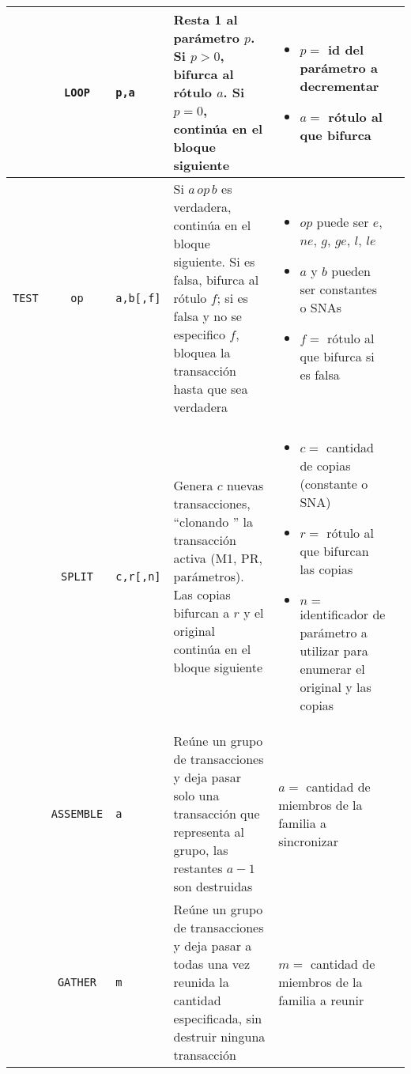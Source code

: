 \documentclass{article}
\providecommand{\tabularnewline}{\\}
\begin{document}
\begin{longtable}{|lc>{\raggedright}p{}|>{\raggedright}p{}|>{\raggedright}p{}|>{\raggedright}p{}|}
\hline
& \texttt{LOOP} & \texttt{p,a} &
Resta 1 al parámetro $p$. Si $p>0$, bifurca al rótulo $a$. Si $p=0$, continúa en el bloque siguiente &
\begin{itemize}
  \item $p=$ id del parámetro a decrementar
  \item $a=$ rótulo al que bifurca
\end{itemize} & \tabularnewline

\hline
\texttt{TEST} & \texttt{op} & \texttt{a,b[,f]} &
Si $a \, op \, b$ es verdadera, continúa en el bloque siguiente.
Si es falsa, bifurca al rótulo $f$; si es falsa y no se especifico $f$,
bloquea la transacción hasta que sea verdadera &
\begin{itemize}
  \item $op$ puede ser $e$, $ne$, $g$, $ge$, $l$, $le$
  \item $a$ y $b$ pueden ser constantes o SNAs
  \item $f=$ rótulo al que bifurca si es falsa
\end{itemize} & \tabularnewline

\hline
\pagebreak

\hline
\multicolumn{6}{c}{\textbf{Familias de transacciones}} \tabularnewline

\hline
& \texttt{SPLIT} & \texttt{c,r[,n]} &
Genera $c$ nuevas transacciones, \textquotedblleft clonando \textquotedblright{}
la transacción activa (M1, PR, parámetros). Las copias bifurcan a $r$ y
el original continúa en el bloque siguiente &
\begin{itemize}
  \item $c=$ cantidad de copias (constante o SNA)
  \item $r=$ rótulo al que bifurcan las copias
  \item $n=$ identificador de parámetro a utilizar para enumerar el original y las copias
\end{itemize} & \tabularnewline

\hline
& \texttt{ASSEMBLE} & \texttt{a} &
Reúne un grupo de transacciones y deja pasar solo una transacción
que representa al grupo, las restantes $a-1$ son destruidas &
$a=$ cantidad de miembros de la familia a sincronizar & \tabularnewline

\hline
& \texttt{GATHER} & \texttt{m} &
Reúne un grupo de transacciones y deja pasar a todas una vez reunida
la cantidad especificada, sin destruir ninguna transacción &
$m=$ cantidad de miembros de la familia a reunir & \tabularnewline


\end{longtable}
\end{document}
